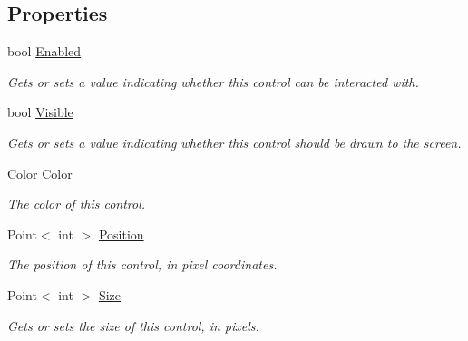 \subsection*{Properties}
\begin{DoxyCompactItemize}
\item 
bool \hyperlink{interface_tri_devs_1_1_tri_engine2_d_1_1_u_i_1_1_i_control_ac9ede42532a11e5b9257b349936cae61}{Enabled}
\begin{DoxyCompactList}\small\item\em Gets or sets a value indicating whether this control can be interacted with. \end{DoxyCompactList}\item 
bool \hyperlink{interface_tri_devs_1_1_tri_engine2_d_1_1_u_i_1_1_i_control_ac0217db5d8c9b8ee6e226df157aceac6}{Visible}
\begin{DoxyCompactList}\small\item\em Gets or sets a value indicating whether this control should be drawn to the screen. \end{DoxyCompactList}\item 
\hyperlink{struct_tri_devs_1_1_tri_engine2_d_1_1_color}{Color} \hyperlink{interface_tri_devs_1_1_tri_engine2_d_1_1_u_i_1_1_i_control_a335ed38fa9721a145ce551c1889bfc49}{Color}
\begin{DoxyCompactList}\small\item\em The color of this control. \end{DoxyCompactList}\item 
Point$<$ int $>$ \hyperlink{interface_tri_devs_1_1_tri_engine2_d_1_1_u_i_1_1_i_control_a521dee44f18d905b5fc0ee94b0f515a2}{Position}
\begin{DoxyCompactList}\small\item\em The position of this control, in pixel coordinates. \end{DoxyCompactList}\item 
Point$<$ int $>$ \hyperlink{interface_tri_devs_1_1_tri_engine2_d_1_1_u_i_1_1_i_control_afc66d577eebbce35df396621c881334c}{Size}
\begin{DoxyCompactList}\small\item\em Gets or sets the size of this control, in pixels. \end{DoxyCompactList}\item 

\end{DoxyCompactItemize}
